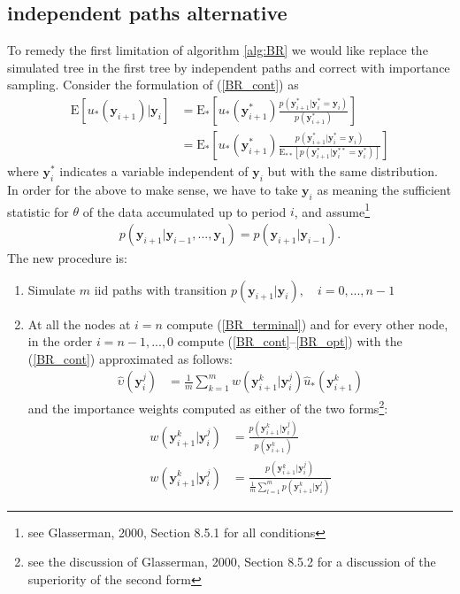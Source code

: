 \documentclass[11pt]{article}
\begin{document}
\subsection{independent paths alternative}
To remedy the first limitation of algorithm \ref{alg:BR} we would
like replace the simulated tree in the first tree by independent
paths and correct with importance sampling. Consider the formulation
of (\ref{BR_cont}) as
\begin{eqnarray}\label{BR_cont_alt_1}
\mathrm{E}[u_{*}(\mathbf{y}_{i+1})|\mathbf{y}_{i}]
&=\mathrm{E}_*[u_{*}(\mathbf{y}_{i+1}^*)\frac{p(\mathbf{y}_{i+1}^*|\mathbf{y}_{i}^*=\mathbf{y}_{i})}{p(\mathbf{y}_{i+1}^*)}]\\\label{BR_cont_alt_2}&=
\mathrm{E}_*[u_{*}(\mathbf{y}_{i+1}^*)\frac{p(\mathbf{y}_{i+1}^*|\mathbf{y}_i^*=\mathbf{y}_i)}{\mathrm{E}_{**}[p(\mathbf{y}_{i+1}^*|\mathbf{y}_{i}^{**}=\mathbf{y}_{i}^*)]}]
\end{eqnarray}where $\mathbf{y}_i^*$ indicates a variable
independent of $\mathbf{y}_i$ but with the same distribution. In
order for the above to make sense, we have to take $\mathbf{y}_i$ as
meaning the sufficient statistic for $\theta$ of the data
accumulated up to period $i$, and assume\footnote{see Glasserman,
2000, Section 8.5.1 for all conditions}
\begin{align}\label{mesh_cond_1}p(\mathbf{y}_{i+1}|\mathbf{y}_{i-1},...,\mathbf{y}_{1})=p(\mathbf{y}_{i+1}|\mathbf{y}_{i-1}).\end{align}
The new procedure is:
\begin{algorithm}[BR--IS]\label{alg:BR_IS}
\hfill\par
\begin{enumerate}
\item Simulate $m$ iid paths with transition
$p(\mathbf{y}_{i+1}|\mathbf{y}_{i}), \quad i=0,...,n-1$
\item At all the nodes at $i=n$ compute
(\ref{BR_terminal}) and for every other node, in the order
$i=n-1,...,0$ compute (\ref{BR_cont}--\ref{BR_opt}) with the
(\ref{BR_cont}) approximated as follows:
\begin{align}\label{BR_IS_est_upsilon}
\hat\upsilon(\mathbf{y}_i^{j})&=\frac{1}{m} \sum_{k=1}^m
w(\mathbf{y}_{i+1}^k|\mathbf{y}_{i}^j)\hat u_*(\mathbf{y}_{i+1}^{k})
\end{align}and the importance weights computed as either of the two
forms\footnote{see the discussion of Glasserman, 2000, Section 8.5.2
for a discussion of the superiority of the second form}:
\begin{align}
w(\mathbf{y}_{i+1}^k|\mathbf{y}_{i}^j)&=\frac{p(\mathbf{y}_{i+1}^k|\mathbf{y}_{i}^j)}{p(\mathbf{y}_{i+1}^k)}\\
w(\mathbf{y}_{i+1}^k|\mathbf{y}_{i}^j)&=\frac{p(\mathbf{y}_{i+1}^k|\mathbf{y}_{i}^j)}{\frac{1}{m}\sum_{l=1}^m
p(\mathbf{y}_{i+1}^k|\mathbf{y}_{i}^l)}
\end{align}
\end{enumerate}
\end{algorithm}
\end{document}

